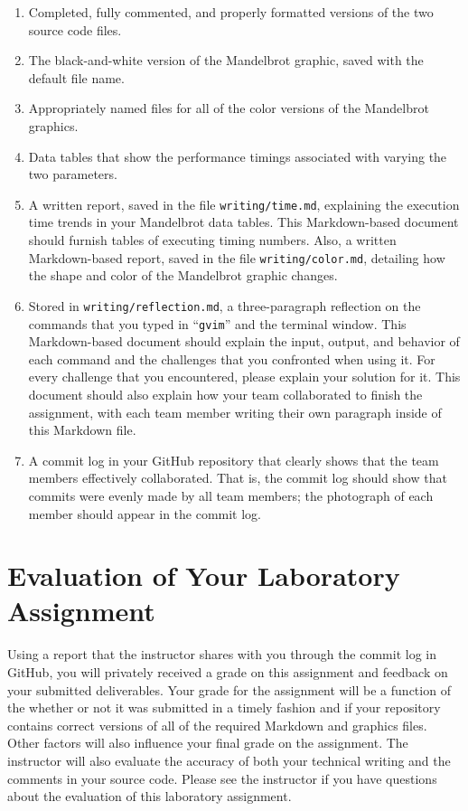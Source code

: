\documentclass[11pt]{article}
\newcommand{\reflection}{\lstinline{writing/reflection.md}}
\newcommand{\timefile}{\lstinline{writing/time.md}}
\newcommand{\colorfile}{\lstinline{writing/color.md}}
\newcommand{\command}[1]{``\lstinline{#1}''}
\begin{document}
\begin{enumerate}

  \setlength{\itemsep}{0in}

  \item Completed, fully commented, and properly formatted versions of the two source code files.
  \item The black-and-white version of the Mandelbrot graphic, saved with the default file name.
  \item Appropriately named files for all of the color versions of the Mandelbrot graphics.
  \item Data tables that show the performance timings associated with varying the two parameters.

  \item A written report, saved in the file \timefile{}, explaining the execution time trends in your Mandelbrot data
    tables. This Markdown-based document should furnish tables of executing timing numbers. Also, a written
    Markdown-based report, saved in the file \colorfile{}, detailing how the shape and color of the Mandelbrot graphic
    changes.

  \item Stored in \reflection{}, a three-paragraph reflection on the commands that you typed in \command{gvim} and the
    terminal window. This Markdown-based document should explain the input, output, and behavior of each command and the
    challenges that you confronted when using it. For every challenge that you encountered, please explain your solution
    for it. This document should also explain how your team collaborated to finish the assignment, with each team member
    writing their own paragraph inside of this Markdown file.

  \item A commit log in your GitHub repository that clearly shows that the team members effectively collaborated. That is,
    the commit log should show that commits were evenly made by all team members; the photograph of each member should
    appear in the commit log.

\end{enumerate}

\section*{Evaluation of Your Laboratory Assignment}

Using a report that the instructor shares with you through the commit log in GitHub, you will privately received a grade
on this assignment and feedback on your submitted deliverables. Your grade for the assignment will be a function of the
whether or not it was submitted in a timely fashion and if your repository contains correct versions of all of the
required Markdown and graphics files. Other factors will also influence your final grade on the assignment. The
instructor will also evaluate the accuracy of both your technical writing and the comments in your source code. Please
see the instructor if you have questions about the evaluation of this laboratory assignment.
\end{document}
